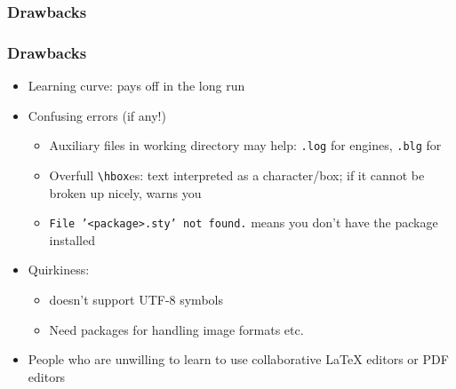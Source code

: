 \documentclass[colorlinks]{beamer} %
\begin{document}
  \subsubsection{Drawbacks}
  \begin{frame}
    \frametitle{Drawbacks}
    \begin{itemize}
     \item Learning curve: pays off in the long run
     \item Confusing errors (if any!)
     \begin{itemize}
      \item Auxiliary files in working directory may help: \texttt{.log} for engines, \texttt{.blg} for 
      \item Overfull \texttt{\textbackslash{}hbox}es: text interpreted as a character/box; if it cannot be broken up nicely, warns you
      \item \texttt{File '<package>.sty' not found.} means you don't have the package installed
     \end{itemize}
     \item Quirkiness:
     \begin{itemize}
      \item {} doesn’t support UTF-8 symbols
      \item Need packages for handling image formats etc.
     \end{itemize}
     \item People who are unwilling to learn to use collaborative \LaTeX{} editors or PDF editors
    \end{itemize}
    \centering
    
  \end{frame}
  
\end{document}
